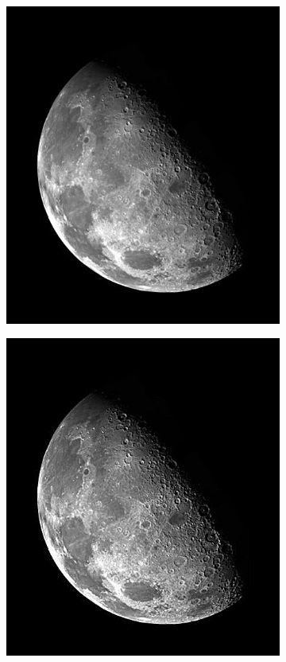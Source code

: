 \documentclass{article}
\begin{document}
\begin{figure}[htbp]
    \centering
    \begin{subfigure}{.3\textwidth}
        \includegraphics[width=\linewidth]{img/laplace/1.png}
    \end{subfigure}
    \begin{subfigure}{.3\textwidth}
        \includegraphics[width=\linewidth]{img/laplace/2.png}

\end{subfigure}
\end{figure}
\end{document}
